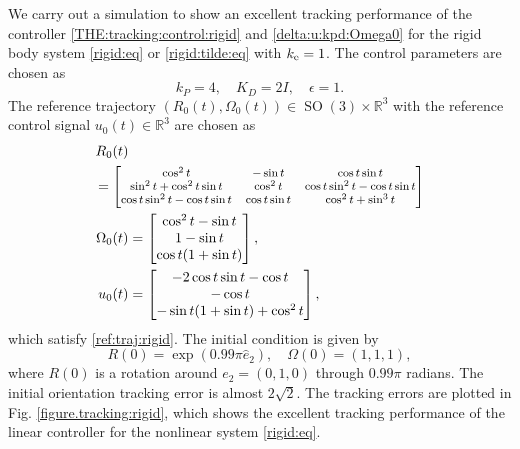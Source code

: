 \documentclass[letterpaper, 10 pt, conference]{ieeeconf}  %
\newtheorem{remark}[theorem]{Remark}
\newcommand{\SO}{\operatorname{SO}(3)}
\newcommand{\MI}{{\mathbb I}}
\newcommand{\coV}{{k_{\rm e}}}
\begin{document}
We carry out a simulation to show an excellent tracking performance of the controller  \eqref{THE:tracking:control:rigid} and \eqref{delta:u:kpd:Omega0}  for the rigid body system \eqref{rigid:eq} or  \eqref{rigid:tilde:eq} with $\coV =1$.
The control parameters are chosen as %
\[
k_P=4, \quad K_D = 2I, \quad \epsilon = 1.
\]
The reference trajectory $(R_0(t), \Omega_0(t)) \in \SO \times \mathbb R^3$ with the reference control signal $u_0(t) \in \mathbb R^3$ are chosen as 
\begin{align*}
R_0(t)  &\\
&\!\!\! \!\!\!\!\!\! \!\!\!\!{\footnotesize = \begin{bmatrix}
\cos^2 t & - \sin t & \cos t\sin t \\
\sin^2 t + \cos^2 t\sin t & \cos^2 t & \cos t \sin^2 t - \cos t \sin t \\
\cos t \sin^2t - \cos t \sin t & \cos t \sin t & \cos^2t + \sin^3t 
\end{bmatrix}}\\
\Omega_0 (t)&= \begin{bmatrix}
\cos^2 t - \sin t \\ 1-\sin t \\ \cos t (1+  \sin t)
\end{bmatrix}, \\
 u_0(t) &= 
 \begin{bmatrix}
-2\cos t \sin t - \cos t \\ -\cos t \\ -\sin t (1+\sin t) + \cos^2 t
\end{bmatrix},
\end{align*}
which satisfy \eqref{ref:traj:rigid}. The initial condition is given by
\[
R(0) = \exp (0.99\pi \hat e_2), \quad \Omega (0) =  (1,1,1),
\]
where $R(0)$ is a rotation around $e_2 = (0,1,0)$ through $0.99\pi$ radians. The initial orientation tracking error is almost $2\sqrt 2$. The tracking errors  are plotted in Fig. \ref{figure.tracking:rigid}, which shows the excellent tracking performance of the linear controller for the nonlinear system \eqref{rigid:eq}.
\end{document}
